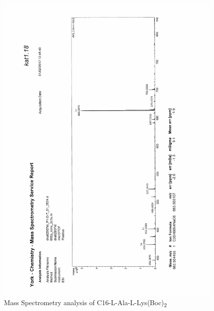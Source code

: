 \begin{figure}[ht!]
\centering
\includegraphics[scale=0.75]{Mass_Spec/KAT1_18.PDF}
\caption{Mass Spectrometry analysis of C16-L-Ala-L-Lys(Boc)\textsubscript{2}}
\end{figure}

